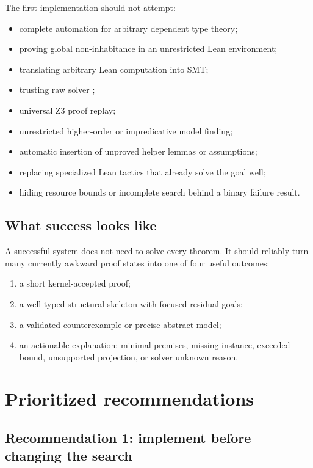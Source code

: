 \documentclass[11pt,letterpaper,openany]{report}
\newcommand{\code}[1]{\texttt{\detokenize{#1}}}
\begin{document}
The first implementation should not attempt:

\begin{itemize}
  \item complete automation for arbitrary dependent type theory;
  \item proving global non-inhabitance in an unrestricted Lean environment;
  \item translating arbitrary Lean computation into SMT;
  \item trusting raw solver \code{unsat};
  \item universal Z3 proof replay;
  \item unrestricted higher-order or impredicative model finding;
  \item automatic insertion of unproved helper lemmas or assumptions;
  \item replacing specialized Lean tactics that already solve the goal well;
  \item hiding resource bounds or incomplete search behind a binary failure result.
\end{itemize}

\section{What success looks like}

A successful system does not need to solve every theorem. It should reliably turn many
currently awkward proof states into one of four useful outcomes:

\begin{enumerate}
  \item a short kernel-accepted proof;
  \item a well-typed structural skeleton with focused residual goals;
  \item a validated counterexample or precise abstract model;
  \item an actionable explanation: minimal premises, missing instance, exceeded bound,
        unsupported projection, or solver unknown reason.
\end{enumerate}

\chapter{Prioritized recommendations}
\label{ch:recommendations}

\section{Recommendation 1: implement \code{leant?} before changing the search}
\end{document}
